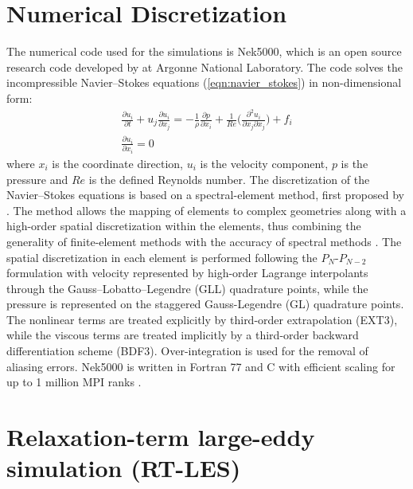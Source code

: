 \section{Numerical Discretization}

The numerical code used for the simulations is Nek5000, which is an open source research code developed by \cite{nek5000} at Argonne National Laboratory. The code solves the incompressible Navier--Stokes equations (\ref{eqn:navier_stokes}) in non-dimensional form:
\begin{subequations}
	\label{eqn:navier_stokes}	
	\begin{eqnarray}
	\frac{\partial u_{i}}{\partial t} + u_{j}\frac{\partial u_{i}}{\partial x_{j}} =  - \frac{1}{\rho}\frac{\partial p}{\partial x_{i}} + \frac{1}{Re}\bigg(\frac{\partial^{2} u_{i}}{\partial x_{j}\partial x_{j}}  \bigg) +f_{i} \\
	\frac{\partial u_{i}}{\partial x_{i}} = 0
	\end{eqnarray}
\end{subequations}
where $x_{i}$ is the coordinate direction, $u_{i}$ is the velocity component, $p$ is the pressure and $Re$ is the defined Reynolds number. The discretization of the Navier--Stokes equations is based on a spectral-element method, first proposed by \cite{patera84}. The method allows the mapping of elements to complex geometries along with a high-order spatial discretization within the elements, thus combining the generality of finite-element methods with the accuracy of spectral methods \citep{patera84}.
The spatial discretization in each element is performed following the $P_{N}$-$P_{N-2}$ \citep{maday89} formulation with velocity represented by high-order Lagrange interpolants through the Gauss--Lobatto--Legendre (GLL) quadrature points, while the pressure is represented on the staggered Gauss-Legendre (GL) quadrature points. The nonlinear terms are treated explicitly by third-order extrapolation (EXT3), while the viscous terms are treated implicitly by a third-order backward differentiation scheme (BDF3). Over-integration is used for the removal of aliasing errors. Nek5000 is written in Fortran 77 and C with efficient scaling for up to 1 million MPI ranks \citep{fischer15}.

\section{Relaxation-term large-eddy simulation (RT-LES)}


